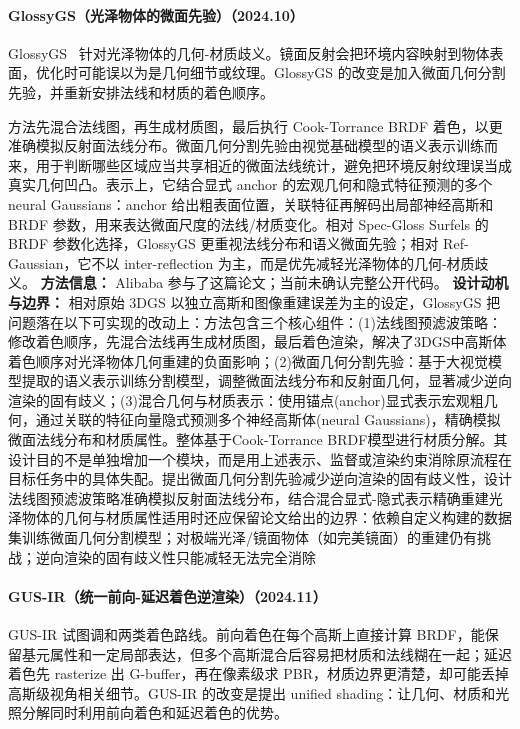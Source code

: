 \paragraph{GlossyGS（光泽物体的微面先验）（2024.10）}
GlossyGS~\cite{2410_13349} 针对光泽物体的几何-材质歧义。镜面反射会把环境内容映射到物体表面，优化时可能误以为是几何细节或纹理。GlossyGS 的改变是加入微面几何分割先验，并重新安排法线和材质的着色顺序。

方法先混合法线图，再生成材质图，最后执行 Cook-Torrance BRDF 着色，以更准确模拟反射面法线分布。微面几何分割先验由视觉基础模型的语义表示训练而来，用于判断哪些区域应当共享相近的微面法线统计，避免把环境反射纹理误当成真实几何凹凸。表示上，它结合显式 anchor 的宏观几何和隐式特征预测的多个 neural Gaussians：anchor 给出粗表面位置，关联特征再解码出局部神经高斯和 BRDF 参数，用来表达微面尺度的法线/材质变化。相对 Spec-Gloss Surfels 的 BRDF 参数化选择，GlossyGS 更重视法线分布和语义微面先验；相对 Ref-Gaussian，它不以 inter-reflection 为主，而是优先减轻光泽物体的几何-材质歧义。
\textbf{方法信息：} Alibaba 参与了这篇论文；当前未确认完整公开代码。
\textbf{设计动机与边界：} 相对原始 3DGS 以独立高斯和图像重建误差为主的设定，GlossyGS 把问题落在以下可实现的改动上：方法包含三个核心组件：(1)法线图预滤波策略：修改着色顺序，先混合法线再生成材质图，最后着色渲染，解决了3DGS中高斯体着色顺序对光泽物体几何重建的负面影响；(2)微面几何分割先验：基于大视觉模型提取的语义表示训练分割模型，调整微面法线分布和反射面几何，显著减少逆向渲染的固有歧义；(3)混合几何与材质表示：使用锚点(anchor)显式表示宏观粗几何，通过关联的特征向量隐式预测多个神经高斯体(neural Gaussians)，精确模拟微面法线分布和材质属性。整体基于Cook-Torrance BRDF模型进行材质分解。其设计目的不是单独增加一个模块，而是用上述表示、监督或渲染约束消除原流程在目标任务中的具体失配。提出微面几何分割先验减少逆向渲染的固有歧义性，设计法线图预滤波策略准确模拟反射面法线分布，结合混合显式-隐式表示精确重建光泽物体的几何与材质属性适用时还应保留论文给出的边界：依赖自定义构建的数据集训练微面几何分割模型；对极端光泽/镜面物体（如完美镜面）的重建仍有挑战；逆向渲染的固有歧义性只能减轻无法完全消除
\paragraph{GUS-IR（统一前向-延迟着色逆渲染）（2024.11）\cite{2411_07478}}
GUS-IR 试图调和两类着色路线。前向着色在每个高斯上直接计算 BRDF，能保留基元属性和一定局部表达，但多个高斯混合后容易把材质和法线糊在一起；延迟着色先 rasterize 出 G-buffer，再在像素级求 PBR，材质边界更清楚，却可能丢掉高斯级视角相关细节。GUS-IR 的改变是提出 unified shading：让几何、材质和光照分解同时利用前向着色和延迟着色的优势。

